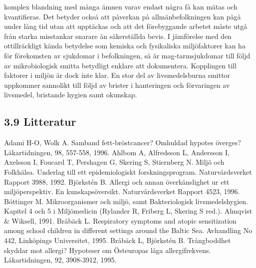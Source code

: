 komplex blandning med många ämnen varav endast några få kan mätas och kvantifieras. Det betyder också att påverkan på allmänbefolkningen kan pågå under lång tid utan att upptäckas och att det förebyggande arbetet måste utgå från starka misstankar snarare än säkerställda bevis.
I jämförelse med den ottillräckligt kända betydelse som kemiska och fysikaliska miljöfaktorer kan ha för förekomsten av sjukdomar i befolkningen, så är mag-tarmsjukdomar till följd av mikrobiologisk smitta betydligt enklare att dokumentera. Kopplingen till faktorer i miljön är dock inte klar. En stor del av livsmedelsburna smittor uppkommer sannolikt till följd av brister i hanteringen och förvaringen av livsmedel, bristande hygien samt okunskap.
\subsection*{3.9 Litteratur}
Adami H-O, Wolk A. Samband fett-bröstcancer? Omhuldad hypotes överges? Läkartidningen, 98, 557-558, 1996.
Ahlbom A, Alfredsson L, Andersson I, Axelsson I, Foucard T, Pershagen G, Skering S, Stiernberg N. Miljö och Folkhälsa. Underlag till ett epidemiologiskt forskningsprogram. Naturvårdsverket Rapport 3988, 1992.
Björkstén B. Allergi och annan överkänslighet ur ett miljöperspektiv. En kunskapsöversikt. Naturvårdsverket Rapport 4523, 1996.
Böttinger M. Mikroorganismer och miljö, samt Bakteriologisk livsmedelshygien. Kapitel 4 och 5 i Miljömedicin (Rylander R, Friberg L, Skering S red.). Almqvist \& Wiksell, 1991.
Bråbäck L. Respiratory symptoms and atopic sensitization among school children in different settings around the Baltic Sea. Avhandling No 442, Linköpings Universitet, 1995.
Bråbäck L, Björkstén B. Trångboddhet skyddar mot allergi? Hypoteser om Östeuropas låga allergifrekvens. Läkartidningen, 92, 3908-3912, 1995.

